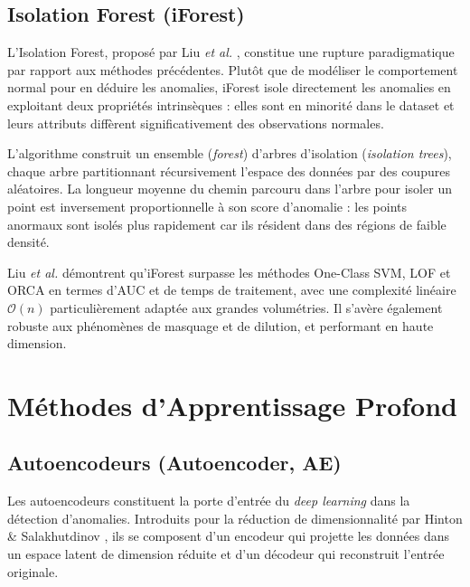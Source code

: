 \documentclass[12pt, a4paper]{article}
\begin{document}
\subsection{Isolation Forest (iForest)}

L'Isolation Forest, proposé par Liu \textit{et al.} \cite{liu2012isolation},
constitue une rupture paradigmatique par rapport aux méthodes précédentes.
Plutôt que de modéliser le comportement normal pour en déduire les anomalies,
iForest isole directement les anomalies en exploitant deux propriétés
intrinsèques : elles sont en minorité dans le dataset et leurs attributs
diffèrent significativement des observations normales.

L'algorithme construit un ensemble (\textit{forest}) d'arbres d'isolation
(\textit{isolation trees}), chaque arbre partitionnant récursivement l'espace
des données par des coupures aléatoires. La longueur moyenne du chemin
parcouru dans l'arbre pour isoler un point est inversement proportionnelle
à son score d'anomalie : les points anormaux sont isolés plus rapidement car
ils résident dans des régions de faible densité.

Liu \textit{et al.} \cite{liu2012isolation} démontrent qu'iForest surpasse les
méthodes One-Class SVM, LOF et ORCA en termes d'AUC et de temps de traitement,
avec une complexité linéaire $\mathcal{O}(n)$ particulièrement adaptée aux
grandes volumétries. Il s'avère également robuste aux phénomènes de masquage
et de dilution, et performant en haute dimension.



\section{Méthodes d'Apprentissage Profond}
\label{sec:deep}

\subsection{Autoencodeurs (Autoencoder, AE)}

Les autoencodeurs constituent la porte d'entrée du \textit{deep learning}
dans la détection d'anomalies. Introduits pour la réduction de dimensionnalité
par Hinton \& Salakhutdinov \cite{hinton2006reducing}, ils se composent
d'un encodeur qui projette les données dans un espace latent de dimension
réduite et d'un décodeur qui reconstruit l'entrée originale.
\end{document}
